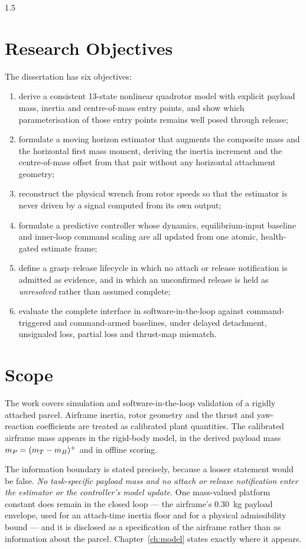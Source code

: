 \begin{spacing}{1.5}
\section{Research Objectives}

The dissertation has six objectives:
\begin{enumerate}
\item derive a consistent 13-state nonlinear quadrotor model with explicit
payload mass, inertia and centre-of-mass entry points, and show which
parameterisation of those entry points remains well posed through release;
\item formulate a moving horizon estimator that augments the composite mass and
the horizontal first mass moment, deriving the inertia increment and the
centre-of-mass offset from that pair without any horizontal attachment geometry;
\item reconstruct the physical wrench from rotor speeds so that the estimator is
never driven by a signal computed from its own output;
\item formulate a predictive controller whose dynamics, equilibrium-input
baseline and inner-loop command scaling are all updated from one atomic,
health-gated estimate frame;
\item define a grasp--release lifecycle in which no attach or release
notification is admitted as evidence, and in which an unconfirmed release is held
as \emph{unresolved} rather than assumed complete;
\item evaluate the complete interface in software-in-the-loop against
command-triggered and command-armed baselines, under delayed detachment,
unsignaled loss, partial loss and thrust-map mismatch.
\end{enumerate}

\section{Scope}

The work covers simulation and software-in-the-loop validation of a rigidly
attached parcel. Airframe inertia, rotor geometry and the thrust and
yaw-reaction coefficients are treated as calibrated plant quantities. The
calibrated airframe mass appears in the rigid-body model, in the derived payload
mass $m_P=(m_T-m_B)^{+}$ and in offline scoring.

The information boundary is stated precisely, because a looser statement would be
false. \emph{No task-specific payload mass and no attach or release notification
enter the estimator or the controller's model update.} One mass-valued platform
constant does remain in the closed loop --- the airframe's \SI{0.30}{\kg} payload
envelope, used for an attach-time inertia floor and for a physical admissibility
bound --- and it is disclosed as a specification of the airframe rather than as
information about the parcel. Chapter~\ref{ch:model} states exactly where it
appears.


\end{spacing}
